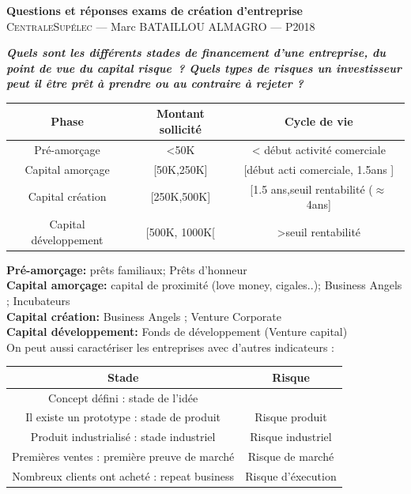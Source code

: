 \documentclass[12pt,oneside,a4paper]{article}
\begin{document}
\begin{center}
{\LARGE \bfseries 
 Questions et réponses exams de création d'entreprise \\[0.3cm] 
}
{\large
  \textsc{CentraleSupélec} --- Marc BATAILLOU ALMAGRO --- P2018\\[0.7cm]
}
\end{center}
  
\textbf{\emph{Quels sont les différents stades de financement d’une entreprise, du point de vue du capital risque ? Quels types de risques un investisseur peut il être prêt à prendre ou au contraire à rejeter ?}}

\vspace{1cm}
\begin{tabular}{|c|c|c|} 
	\hline
	 Phase & Montant sollicité & Cycle de vie\\
	 \hline
	 Pré-amorçage & <50K & < début activité comerciale\\
	 \hline
	 Capital amorçage & [50K,250K] & [début acti comerciale, 1.5ans ]\\
	 \hline
	 Capital création & [250K,500K] & [1.5 ans,seuil rentabilité ($\approx$4ans]\\
	 \hline
	 Capital développement & [500K, 1000K[ & >seuil rentabilité\\
	 \hline
\end{tabular} 
\vspace{1cm}

\noindent
\textbf{Pré-amorçage:} prêts familiaux; Prêts d'honneur \\
\textbf{Capital amorçage:} capital de proximité (love money, cigales..); Business Angels ; Incubateurs\\
\textbf{Capital création: }Business Angels ; Venture Corporate\\
\textbf{Capital développement:} Fonds de développement (Venture capital)\\

On peut aussi caractériser les entreprises avec d'autres indicateurs : 

\vspace{1cm}
\begin{center}
\begin{tabular}{|c|c|}
	\hline
	Stade & Risque\\
	\hline
	Concept défini : stade de l'idée & \\
	\hline
	Il existe un prototype : stade de produit & Risque produit\\
	\hline
	Produit industrialisé : stade industriel & Risque industriel\\
	\hline
	Premières ventes : première preuve de marché & Risque de marché\\
	\hline
	Nombreux clients ont acheté : repeat business & Risque d'éxecution\\
	\hline

\end{tabular}
\end{center}
\vspace{1cm}
\end{document}
